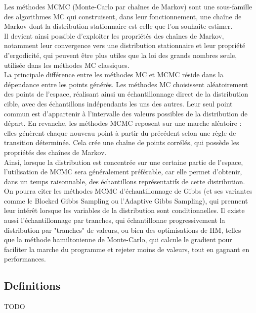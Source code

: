 \documentclass{article}
\begin{document}
Les méthodes MCMC (Monte-Carlo par chaînes de Markov) sont une sous-famille des algorithmes MC qui construisent, dans leur fonctionnement, une chaîne de Markov dont la distribution stationnaire est celle que l’on souhaite estimer. \\
Il devient ainsi possible d'exploiter les propriétés des chaînes de Markov, notamment leur convergence vers une distribution stationnaire et leur propriété d'ergodicité, qui peuvent être plus utiles que la loi des grands nombres seule, utilisée dans les méthodes MC classiques. \\
La principale différence entre les méthodes MC et MCMC réside dans la dépendance entre les points générés. Les méthodes MC choisissent aléatoirement des points de l'espace, réalisant ainsi un échantillonnage direct de la distribution cible, avec des échantillons indépendants les uns des autres. Leur seul point commun est d'appartenir à l'intervalle des valeurs possibles de la distribution de départ. En revanche, les méthodes MCMC reposent sur une marche aléatoire : elles génèrent chaque nouveau point à partir du précédent selon une règle de transition déterminée. Cela crée une chaîne de points corrélés, qui possède les propriétés des chaînes de Markov. \\
Ainsi, lorsque la distribution est concentrée sur une certaine partie de l'espace, l’utilisation de MCMC sera généralement préférable, car elle permet d'obtenir, dans un temps raisonnable, des échantillons représentatifs de cette distribution. \\

On pourra citer les méthodes MCMC d'échantillonnage de Gibbs (et ses variantes comme le Blocked Gibbs Sampling ou l'Adaptive Gibbs Sampling), qui prennent leur intérêt lorsque les variables de la distribution sont conditionnelles. Il existe aussi l’échantillonnage par tranches, qui échantillonne progressivement la distribution par "tranches" de valeurs, ou bien des optimisations de HM, telles que la méthode hamiltonienne de Monte-Carlo, qui calcule le gradient pour faciliter la marche du programme et rejeter moins de valeurs, tout en gagnant en performances. \\

\subsection{Definitions}

TODO \\
\end{document}

